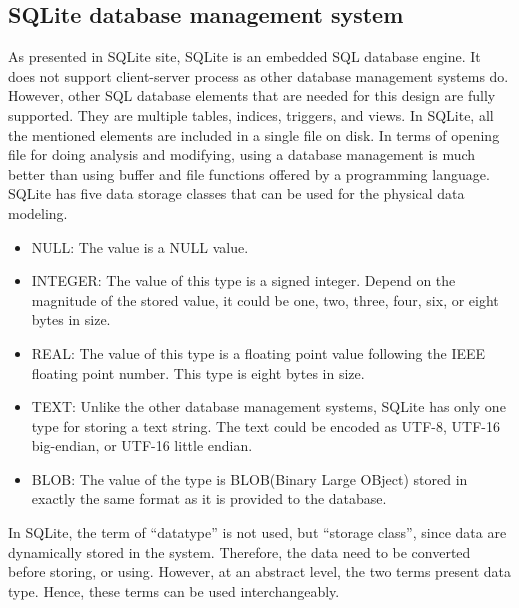 \subsection{SQLite database management system}
As presented in SQLite site\citep{SQLITEORG}, SQLite is an embedded SQL database engine. It does not support client-server process as other database management systems do. However, other SQL database elements that are needed for this design are fully supported. They are multiple tables, indices, triggers, and views. In SQLite, all the mentioned elements are included in a single file on disk. In terms of opening file for doing analysis and modifying, using a database management is much better than using buffer and file functions offered by a programming language.\\
SQLite has five data storage classes that can be used for the physical data modeling.
\begin{itemize}
\item NULL: The value is a NULL value.\\
\item INTEGER: The value of this type is a signed integer. Depend on the magnitude of the stored value, it could be one, two, three, four, six, or eight bytes in size.\\
\item REAL: The value of this type is a floating point value following the IEEE floating point number. This type is eight bytes in size.\\
\item TEXT: Unlike the other database management systems, SQLite has only one type for storing a text string. The text could be encoded as UTF-8, UTF-16 big-endian, or UTF-16 little endian.\\
\item BLOB: The value of the type is BLOB(Binary Large OBject) stored in exactly the same format as it is provided to the database.
\end{itemize}
In SQLite, the term of “datatype” is not used, but “storage class”, since data are dynamically stored in the system. Therefore, the data need to be converted before storing, or using. However, at an abstract level, the two terms present data type. Hence, these terms can be used interchangeably.
